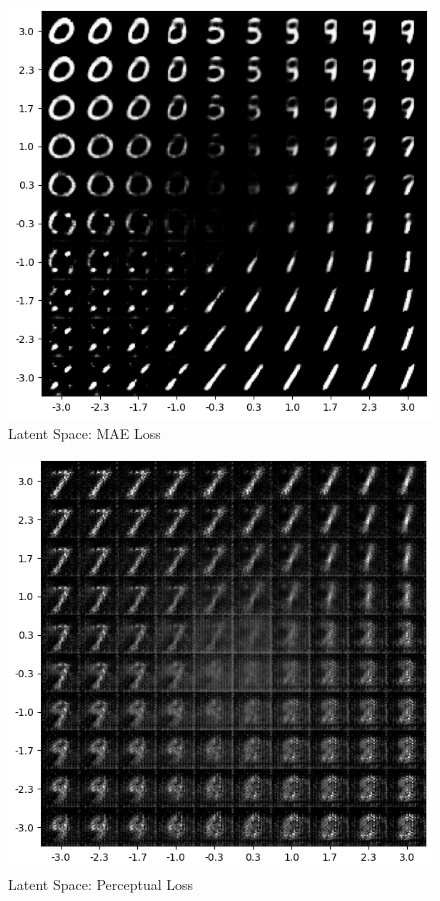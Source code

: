 \documentclass[12pt]{article}
\begin{document}
\begin{figure}[h]
\centering
\includegraphics[width=1\linewidth]{report_images/mae/latent_space.png}
\caption{\label{fig:latent_mae}Latent Space: MAE Loss}
\end{figure}

\begin{figure}[h]
\centering
\includegraphics[width=1\linewidth]{report_images/percep/latent_space.png}
\caption{\label{fig:latent_percep}Latent Space: Perceptual Loss}
\end{figure}
\end{document}
